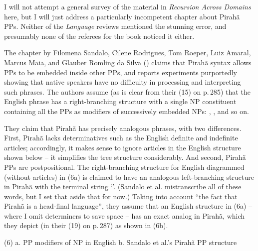 \documentclass[output=paper,colorlinks,citecolor=brown
]{langscibook}
\begin{document}
I will not attempt a general survey of the material in
\textit{Recursion Across Domains} here, but I will just address a
particularly incompetent chapter about Pirah{\~a} PPs. Neither of
the \textit{Language} reviews mentioned the stunning error, and
presumably none of the referees for the book noticed it either.

The chapter by Filomena Sandalo, Cilene Rodrigues, Tom Roeper, Luiz Amaral,
Marcus Maia, and Glauber Romling da Silva (\citeyear{SandaloEtAl18})
claims that Pirah{\~a} syntax allows PPs to be embedded inside other PPs,
and reports experiments purportedly showing that native speakers have no
difficulty in processing and interpreting such phrases. The authors assume
(as is clear from their (15) on p.\,285) that the English phrase
 has a
right-branching structure with a single NP constituent containing
all the PPs as modifiers of successively embedded NPs:
,
, and so on.

They claim that Pirah{\~a} has precisely analogous phrases, with two
differences. First, Pirah{\~a} lacks determinatives such as the English
definite and indefinite articles; accordingly, it makes sense to ignore
articles in the English structure shown below -- it simplifies the tree
structure considerably.  And second, Pirah{\~a} PPs are postpositional.
The right-branching structure for English diagrammed (without articles)
in (6a) is claimed to have an analogous left-branching structure in
Pirah{\~a} with the terminal string `'. (Sandalo et al. mistranscribe all of these
words, but I set that aside that for now.) Taking into account ``the
fact that Pirah{\~a} is a head-final language'', they assume that an
English structure in (6a) -- where I omit determiners to save space
-- has an exact analog in Pirah{\~a}, which they depict
(in their (19) on p.\,287) as shown in (6b).

\noindent
(6) a. PP modifiers of NP in English\hspace*{3ex}
    b. Sandalo et al.'s Pirah{\~a} PP structure

\nopagebreak[4]
\end{document}
